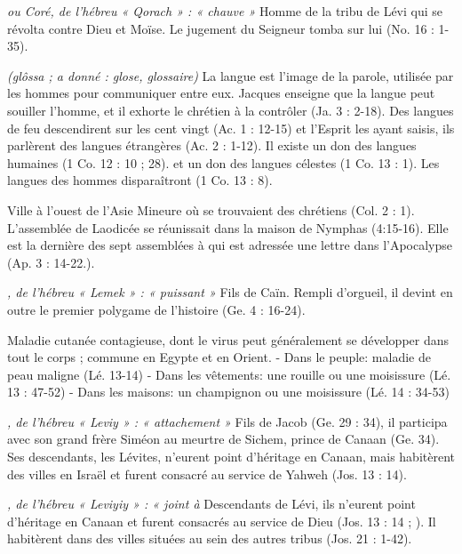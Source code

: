 \begin{multicols}{2}
\textit{ou Coré, de l'hébreu « Qorach » : « chauve »}\newline
Homme de la tribu de Lévi qui se révolta contre Dieu et Moïse. Le jugement du Seigneur tomba sur lui (No. 16 : 1-35).

\textit{(glôssa ; a donné : glose, glossaire)}\newline
La langue est l'image de la parole, utilisée par les hommes pour communiquer entre eux. Jacques enseigne que la langue peut souiller l'homme, et il exhorte le chrétien à la contrôler (Ja. 3 : 2-18). Des langues de feu descendirent sur les cent vingt (Ac. 1 : 12-15) et l’Esprit les ayant saisis, ils parlèrent des langues étrangères (Ac. 2 : 1-12). Il existe un don des langues humaines (1 Co. 12 : 10 ; 28). et un don des langues célestes (1 Co. 13 : 1). Les langues des hommes disparaîtront (1 Co. 13 : 8).

\textit{}\newline
Ville à l'ouest de l'Asie Mineure où se trouvaient des chrétiens (Col. 2 : 1). L'assemblée de Laodicée se réunissait dans la maison de Nymphas (4:15-16). Elle est la dernière des sept assemblées à qui est adressée une lettre dans l'Apocalypse (Ap. 3 : 14-22.).

\textit{, de l'hébreu « Lemek » : « puissant »}\newline
Fils de Caïn. Rempli d'orgueil, il devint en outre le premier polygame de l'histoire (Ge. 4 : 16-24).

\textit{}\newline
Maladie cutanée contagieuse, dont le virus peut généralement se développer dans tout le corps ; commune en Egypte et en Orient.
- Dans le peuple: maladie de peau maligne (Lé. 13-14)
- Dans les vêtements: une rouille ou une moisissure (Lé. 13 : 47-52)
- Dans les maisons: un champignon ou une moisissure (Lé. 14 : 34-53)

\textit{, de l'hébreu « Leviy » : « attachement »}\newline
Fils de Jacob (Ge. 29 : 34), il participa avec son grand frère Siméon au meurtre de Sichem, prince de Canaan (Ge. 34). Ses descendants, les Lévites, n'eurent point d'héritage en Canaan, mais habitèrent des villes en Israël et furent consacré au service de Yahweh (Jos. 13 : 14).

\textit{, de l'hébreu « Leviyiy » : « joint à}\newline
Descendants de Lévi, ils n'eurent point d'héritage en Canaan et furent consacrés au service de Dieu (Jos. 13 : 14 ; ). Il habitèrent dans des villes situées au sein des autres tribus (Jos. 21 : 1-42).


\end{multicols}
